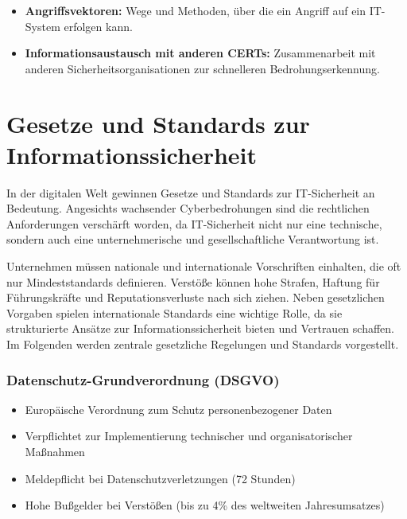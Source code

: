 \documentclass{orgstandard}
\begin{document}
\begin{NOTES}
\begin{itemize}
\item \textbf{Angriffsvektoren:} Wege und Methoden, über die ein Angriff auf ein IT-System erfolgen kann.
\item \textbf{Informationsaustausch mit anderen CERTs:} Zusammenarbeit mit anderen Sicherheitsorganisationen zur schnelleren Bedrohungserkennung.
\end{itemize}
\end{NOTES}
\section{Gesetze und Standards zur Informationssicherheit}
\label{sec:orgf0a91b6}

In der digitalen Welt gewinnen Gesetze und Standards zur IT-Sicherheit an Bedeutung. Angesichts wachsender Cyberbedrohungen sind die rechtlichen Anforderungen verschärft worden, da IT-Sicherheit nicht nur eine technische, sondern auch eine unternehmerische und gesellschaftliche Verantwortung ist.

\begin{NOTES}
Unternehmen müssen nationale und internationale Vorschriften einhalten, die oft nur Mindeststandards definieren. Verstöße können hohe Strafen, Haftung für Führungskräfte und Reputationsverluste nach sich ziehen. Neben gesetzlichen Vorgaben spielen internationale Standards eine wichtige Rolle, da sie strukturierte Ansätze zur Informationssicherheit bieten und Vertrauen schaffen. Im Folgenden werden zentrale gesetzliche Regelungen und Standards vorgestellt.
\end{NOTES}
\subsubsection{Datenschutz-Grundverordnung (DSGVO)}
\label{sec:org31e8730}
\begin{itemize}
\item Europäische Verordnung zum Schutz personenbezogener Daten
\item Verpflichtet zur Implementierung technischer und organisatorischer Maßnahmen
\item Meldepflicht bei Datenschutzverletzungen (72 Stunden)
\item Hohe Bußgelder bei Verstößen (bis zu 4\% des weltweiten Jahresumsatzes)
\end{itemize}
\end{document}
